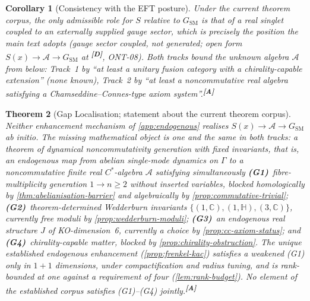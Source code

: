 \documentclass[12pt,a4paper,twoside]{article}
\theoremstyle{plain}
\newtheorem{theorem}{Theorem}[section]
\newtheorem{corollary}[theorem]{Corollary}
\theoremstyle{definition}
\theoremstyle{remark}
\newcommand{\catmark}[1]{\textsuperscript{\textsf{\textbf{[#1]}}}}
\begin{document}
\begin{corollary}[Consistency with the EFT posture]
\label{cor:eft-posture}
Under the current theorem corpus, the only admissible role for $S$ relative
to $G_{\mathrm{SM}}$ is that of a real singlet coupled to an externally
supplied gauge sector, which is precisely the position the main text adopts
(gauge sector coupled, not generated; open form
$S(x)\to\mathcal{A}\to G_{\mathrm{SM}}$ at \catmark{D}, ONT-08). Both
tracks bound the unknown algebra $\mathcal{A}$ from below: Track~1 by ``at
least a unitary fusion category with a chirality-capable extension'' (none
known), Track~2 by ``at least a noncommutative real algebra satisfying a
Chamseddine--Connes-type axiom system''.\catmark{A}
\end{corollary}

\begin{theorem}[Gap Localisation; statement about the current theorem corpus]
\label{thm:gap-localisation}
Neither enhancement mechanism of \cref{app:endogenous} realises
$S(x)\to\mathcal{A}\to G_{\mathrm{SM}}$ ab initio. The missing
mathematical object is one and the same in both tracks: a theorem of
\emph{dynamical noncommutativity generation with fixed invariants}, that
is, an endogenous map from abelian single-mode dynamics on $\Gamma$ to a
noncommutative finite real $C^{*}$-algebra $\mathcal{A}$ satisfying
simultaneously
\textbf{(G1)}~fibre-multiplicity generation $1\to n\ge 2$ without inserted
variables, blocked homologically by \cref{thm:abelianisation-barrier} and
algebraically by \cref{prop:commutative-trivial};
\textbf{(G2)}~theorem-determined Wedderburn invariants
$\{(1,\mathbb{C}),(1,\mathbb{H}),(3,\mathbb{C})\}$, currently free moduli
by \cref{prop:wedderburn-moduli};
\textbf{(G3)}~an endogenous real structure $J$ of KO-dimension~6,
currently a choice by \cref{prop:cc-axiom-status}; and
\textbf{(G4)}~chirality-capable matter, blocked by
\cref{prop:chirality-obstruction}. The unique established endogenous
enhancement (\cref{prop:frenkel-kac}) satisfies a weakened (G1) only in
$1{+}1$ dimensions, under compactification and radius tuning, and is
rank-bounded at one against a requirement of four
(\cref{lem:rank-budget}). No element of the established corpus satisfies
(G1)--(G4) jointly.\catmark{A}
\end{theorem}
\end{document}
